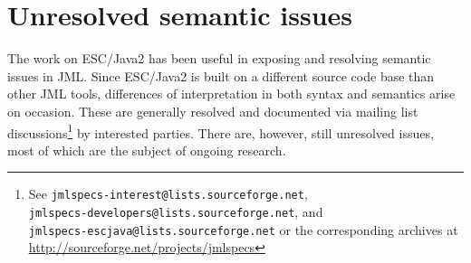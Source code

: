 \documentclass{llncs}
\begin{document}
\section{Unresolved semantic issues}

The work on ESC/Java2 has been useful in exposing and resolving
semantic issues in JML.  Since ESC/Java2 is built on a different
source code base than other JML tools, differences of interpretation
in both syntax and semantics arise on occasion.  These are generally
resolved and documented via mailing list discussions\footnote{See
  \texttt{jmlspecs-interest@lists.sourceforge.net},\\
  \texttt{jmlspecs-developers@lists.sourceforge.net}, and \\
  \texttt{jmlspecs-escjava@lists.sourceforge.net} or the corresponding
  archives at \url{http://sourceforge.net/projects/jmlspecs}} by
interested parties.  There are, however, still unresolved issues, most
of which are the subject of ongoing research.
\setlength{\partopsep}{0in}\setlength{\parskip}{0in}\setlength{\itemsep}{0in}\setlength{\topsep}{0in}
\end{document}
